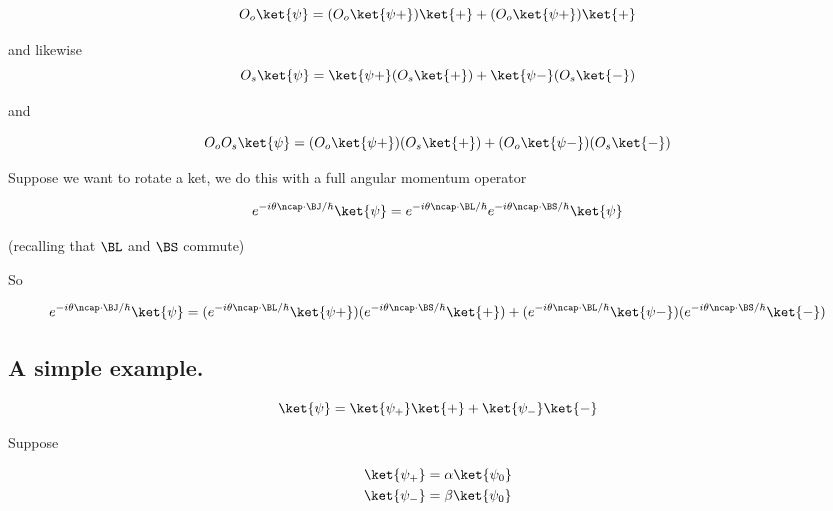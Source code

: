 \begin{equation}\label{eqn:qmTwoL14:190}
O_o \ket{\psi} = (O_o \ket{\psi+}) \ket{+}
+ (O_o \ket{\psi+}) \ket{+}
\end{equation}

and likewise
\begin{equation}\label{eqn:qmTwoL14:70}
O_s \ket{\psi} = 
\ket{\psi+} (O_s \ket{+})
+
\ket{\psi-} (O_s \ket{-})
\end{equation}

and

\begin{equation}\label{eqn:qmTwoL14:90}
O_o O_s \ket{\psi} = 
(O_o \ket{\psi+}) (O_s \ket{+})
+
(O_o \ket{\psi-}) (O_s \ket{-})
\end{equation}

Suppose we want to rotate a ket, we do this with a full angular momentum operator

\begin{equation}\label{eqn:qmTwoL14:110}
e^{-i \theta \ncap \cdot \BJ/\hbar} \ket{\psi}
=
e^{-i \theta \ncap \cdot \BL/\hbar} 
e^{-i \theta \ncap \cdot \BS/\hbar} 
\ket{\psi}
\end{equation}

(recalling that $\BL$ and $\BS$ commute)

So

\begin{equation}\label{eqn:qmTwoL14:130}
e^{-i \theta \ncap \cdot \BJ/\hbar} \ket{\psi}
=
(e^{-i \theta \ncap \cdot \BL/\hbar} \ket{\psi+}) (e^{-i \theta \ncap \cdot \BS/\hbar} \ket{+})
+
(e^{-i \theta \ncap \cdot \BL/\hbar} \ket{\psi-}) (e^{-i \theta \ncap \cdot \BS/\hbar} \ket{-})
\end{equation}

\subsection{A simple example.}

\begin{equation}\label{eqn:qmTwoL14:210}
\ket{\psi} = 
\ket{\psi_+} \ket{+}
+
\ket{\psi_-} \ket{-}
\end{equation}

Suppose 

\begin{align}\label{eqn:qmTwoL14:230}
\ket{\psi_+} &= \alpha \ket{\psi_0} \\
\ket{\psi_-} &= \beta \ket{\psi_0}
\end{align}

